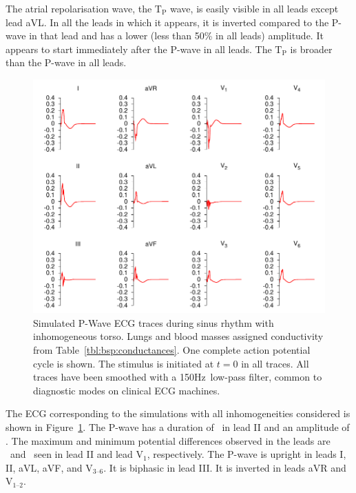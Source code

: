 The atrial repolarisation wave, the $\text{T}_{\text{P}}$ wave, is easily
visible in all leads except lead aVL.
In all the leads in which it appears, it is inverted compared to the P-wave in
that lead and has a lower (less than 50\% in all leads) amplitude.
It appears to start immediately after the P-wave in all leads.
The $\text{T}_{\text{P}}$ is broader than the P-wave in all leads.

\begin{figure}
\includegraphics{figures/bsp/ecg_all_150Hz}
\caption[12 lead ECG during sinus rhythm, all internal inhomogeneities present.]{
\label{bsp:fig:ecg_all}
Simulated P-Wave ECG traces during sinus rhythm with inhomogeneous torso.
Lungs and blood masses assigned conductivity from Table~\ref{tbl:bsp:conductances}.
One complete action potential cycle is shown.
The stimulus is initiated at $t = 0$ in all traces.
All traces have been smoothed with a \unit{150}{Hz}\ low-pass filter, common to
diagnostic modes on clinical ECG machines.
}
\end{figure}

The ECG corresponding to the simulations with all inhomogeneities considered is shown in
Figure~\ref{bsp:fig:ecg_all}.
The P-wave has a duration of \ in lead II and an amplitude of .
The maximum and minimum potential differences observed in the leads are
\ and \ seen in lead II and lead $\text{V}_{\text{1}}$, respectively.
The P-wave is upright in leads I, II, aVL, aVF, and $\text{V}_{\text{3--6}}$.
It is biphasic in lead III.
It is inverted in leads aVR and $\text{V}_{\text{1--2}}$.

